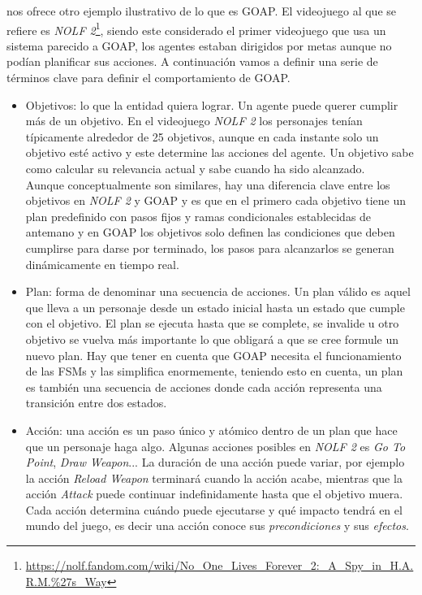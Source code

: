 \citet{GOAP_Jeff_Orkin} nos ofrece otro ejemplo ilustrativo de lo que es GOAP. El videojuego al que se refiere es \textit{NOLF 2}\footnote{\url{https://nolf.fandom.com/wiki/No_One_Lives_Forever_2:_A_Spy_in_H.A.R.M.\%27s_Way}}, siendo este considerado el primer videojuego que usa un sistema parecido a GOAP, los agentes estaban dirigidos por metas aunque no podían planificar sus acciones.
A continuación vamos a definir una serie de términos clave para definir el comportamiento de GOAP.
\begin{itemize}
	 \item Objetivos: lo que la entidad quiera lograr. Un agente puede querer cumplir más de un objetivo. En el videojuego \textit{NOLF 2} los personajes tenían típicamente alrededor de 25 objetivos, aunque en cada instante solo un objetivo esté activo y este determine las acciones del agente. Un objetivo sabe como calcular su relevancia actual y sabe cuando ha sido alcanzado.\\
Aunque conceptualmente son similares, hay una diferencia clave entre los objetivos en \textit{NOLF 2} y GOAP y es que en el primero cada objetivo tiene un plan predefinido con pasos fijos y ramas condicionales establecidas de antemano y en GOAP los objetivos solo definen las condiciones que deben cumplirse para darse por terminado, los pasos para alcanzarlos se generan dinámicamente en tiempo real.

	 \item Plan: forma de denominar una secuencia de acciones. Un plan válido es aquel que lleva a un personaje desde un estado inicial hasta un estado que cumple con el objetivo. El plan se ejecuta hasta que se complete, se invalide u otro objetivo se vuelva más importante lo que obligará a que se cree formule un nuevo plan.
Hay que tener en cuenta que GOAP necesita el funcionamiento de las FSMs y las simplifica enormemente, teniendo esto en cuenta, un plan es también una secuencia de acciones donde cada acción representa una transición entre dos estados.

	 \item Acción: una acción es un paso único y atómico dentro de un plan que hace que un personaje haga algo. Algunas acciones posibles en \textit{NOLF 2} es \textit{Go To Point}, \textit{Draw Weapon}...
La duración de una acción puede variar, por ejemplo la acción \textit{Reload Weapon} terminará cuando la acción acabe, mientras que la acción \textit{Attack} puede continuar indefinidamente hasta que el objetivo muera.\\
Cada acción determina cuándo puede ejecutarse y qué impacto tendrá en el mundo del juego, es decir una acción conoce sus \textit{precondiciones} y sus \textit{efectos}.
	

\end{itemize}
